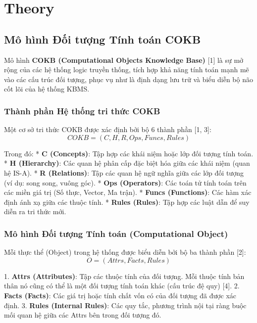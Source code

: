 \chapter{Theory}
\section{Mô hình Đối tượng Tính toán COKB}

Mô hình \textbf{COKB (Computational Objects Knowledge Base)} [1] là sự mở rộng của các hệ thống logic truyền thống, tích hợp khả năng tính toán mạnh mẽ vào các cấu trúc đối tượng, phục vụ như là định dạng lưu trữ và biểu diễn bộ não cốt lõi của hệ thống KBMS.

\subsection{Thành phần Hệ thống tri thức COKB}

Một cơ sở tri thức COKB được xác định bởi bộ 6 thành phần [1, 3]:
\begin{equation}
COKB = (C, H, R, Ops, Funcs, Rules)
\end{equation}

Trong đó:
*   \textbf{C (Concepts)}: Tập hợp các khái niệm hoặc lớp đối tượng tính toán.
*   \textbf{H (Hierarchy)}: Các quan hệ phân cấp đặc biệt hóa giữa các khái niệm (quan hệ IS-A).
*   \textbf{R (Relations)}: Tập các quan hệ ngữ nghĩa giữa các lớp đối tượng (ví dụ: song song, vuông góc).
*   \textbf{Ops (Operators)}: Các toán tử tính toán trên các miền giá trị (Số thực, Vector, Ma trận).
*   \textbf{Funcs (Functions)}: Các hàm xác định ánh xạ giữa các thuộc tính.
*   \textbf{Rules (Rules)}: Tập hợp các luật dẫn để suy diễn ra tri thức mới.

\subsection{Mô hình Đối tượng Tính toán (Computational Object)}

Mỗi thực thể (Object) trong hệ thống được biểu diễn bởi bộ ba thành phần [2]:
\begin{equation}
O = (Attrs, Facts, Rules)
\end{equation}

1.  \textbf{Attrs (Attributes)}: Tập các thuộc tính của đối tượng. Mỗi thuộc tính bản thân nó cũng có thể là một đối tượng tính toán khác (cấu trúc đệ quy) [4].
2.  \textbf{Facts (Facts)}: Các giá trị hoặc tính chất vốn có của đối tượng đã được xác định.
3.  \textbf{Rules (Internal Rules)}: Các quy tắc, phương trình nội tại ràng buộc mối quan hệ giữa các Attrs bên trong đối tượng đó.

